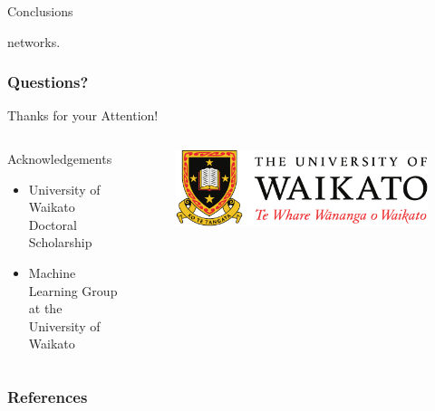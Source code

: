 \documentclass[handout]{beamer}
\begin{document}
\begin{frame}{Conclusions}
\begin{scriptsize}
\begin{itemize}
networks. 
\end{itemize}
\end{scriptsize}

\end{frame}



\begin{frame}
\frametitle{Questions?}
\begin{center}\LARGE Thanks for your Attention!\\  \end{center}

\begin{columns}
\begin{column}{0.55\textwidth}
\begin{block}{Acknowledgements}
\begin{itemize}\tiny
	\item University of Waikato Doctoral Scholarship
	\item Machine Learning Group at the University of Waikato
	
\end{itemize}
\end{block}
\end{column}
\begin{column}{0.45\textwidth}
\vspace{1.5cm}

\begin{figure}[h!]
	\centering
	\includegraphics[scale=0.3]{pics/logo.pdf}
\end{figure}
\end{column}
\end{columns}

\end{frame}

\begin{frame}[allowframebreaks]\scriptsize
\frametitle{References}


%
\end{frame}  


\end{document}
